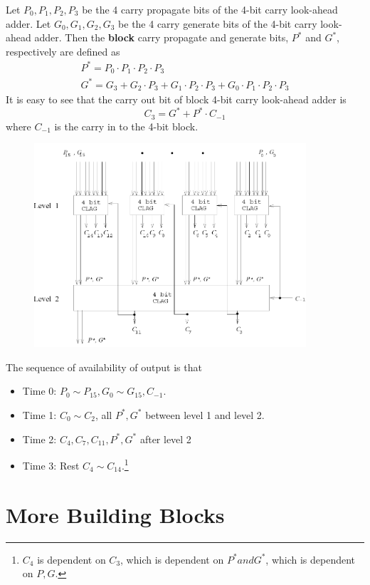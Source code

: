 \documentclass[12pt]{article}
\theoremstyle{definition}
\begin{document}
Let $P_0,P_1,P_2,P_3$ be the 4 carry propagate bits of the 4-bit carry look-ahead adder. Let $G_0,G_1,G_2,G_3$ be the 4 carry generate bits of the 4-bit carry look-ahead adder. Then the \textbf{block} carry propagate and generate bits, $P^\ast $ and $G^\ast$, respectively are defined as
\begin{align*}
P^\ast = P_0\cdot P_1\cdot P_2\cdot P_3\\
G^\ast = G_3+G_2\cdot P_3+G_1\cdot P_2\cdot P_3+G_0\cdot P_1\cdot P_2\cdot P_3
\end{align*}
It is easy to see that the carry out bit of block 4-bit carry look-ahead adder is 
\[
C_3 = G^\ast +P^\ast\cdot C_{-1}
\]
where $C_{-1}$ is the carry in to the 4-bit block.
\begin{figure}[h]
\centering
\includegraphics[width = 0.9\textwidth]{6_13.png}
\end{figure}
The sequence of availability of output is that
\begin{itemize}
  \item Time 0: $P_0\sim P_{15},G_0\sim G_{15}, C_{-1}$.
  \item Time 1: $C_0\sim C_2$, all $P^\ast, G^\ast$ between level 1 and level 2.
  \item Time 2: $C_4,C_7,C_11,P^\ast,G^\ast$ after level 2
  \item Time 3: Rest $C_4\sim C_{14}$.\footnote{$C_4$ is dependent on $C_3$, which is dependent on $P^\ast and G^\ast$, which is dependent on $P,G$.}
\end{itemize}
\clearpage
\section{More Building Blocks}
\end{document}
